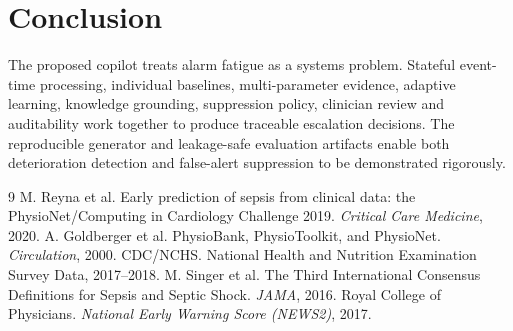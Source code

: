 \documentclass[11pt,a4paper]{article}
\begin{document}
\section{Conclusion}
The proposed copilot treats alarm fatigue as a systems problem. Stateful event-time processing, individual baselines, multi-parameter evidence, adaptive learning, knowledge grounding, suppression policy, clinician review and auditability work together to produce traceable escalation decisions. The reproducible generator and leakage-safe evaluation artifacts enable both deterioration detection and false-alert suppression to be demonstrated rigorously.

\begin{thebibliography}{9}
 M. Reyna et al. Early prediction of sepsis from clinical data: the PhysioNet/Computing in Cardiology Challenge 2019. \emph{Critical Care Medicine}, 2020.
 A. Goldberger et al. PhysioBank, PhysioToolkit, and PhysioNet. \emph{Circulation}, 2000.
 CDC/NCHS. National Health and Nutrition Examination Survey Data, 2017--2018.
 M. Singer et al. The Third International Consensus Definitions for Sepsis and Septic Shock. \emph{JAMA}, 2016.
 Royal College of Physicians. \emph{National Early Warning Score (NEWS2)}, 2017.
\end{thebibliography}
\end{document}
